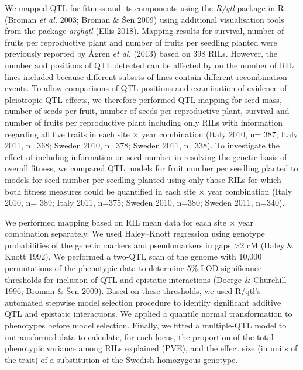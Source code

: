 \documentclass[12pt,]{article}
\begin{document}
We mapped QTL for fitness and its components using the \emph{R/qtl} package in R (Broman \emph{et al.} 2003; Broman \& Šen 2009) using additional visualisation tools from the package \emph{arghqtl} (Ellis 2018). Mapping results for survival, number of fruits per reproductive plant and number of fruits per seedling planted were previously reported by Ågren \emph{et al.} (2013) based on 398 RILs. However, the number and positions of QTL detected can be affected by on the number of RIL lines included because different subsets of lines contain different recombination events. To allow comparisons of QTL positions and examination of evidence of pleiotropic QTL effects, we therefore performed QTL mapping for seed mass, number of seeds per fruit, number of seeds per reproductive plant, survival and number of fruits per reproductive plant including only RILs with information regarding all five traits in each site × year combination (Italy 2010, n= 387; Italy 2011, n=368; Sweden 2010, n=378; Sweden 2011, n=338). To investigate the effect of including information on seed number in resolving the genetic basis of overall fitness, we compared QTL models for fruit number per seedling planted to models for seed number per seedling planted using only those RILs for which both fitness measures could be quantified in each site × year combination (Italy 2010, n= 389; Italy 2011, n=375; Sweden 2010, n=380; Sweden 2011, n=340).

We performed mapping based on RIL mean data for each site × year combination separately. We used Haley--Knott regression using genotype probabilities of the genetic markers and pseudomarkers in gaps \textgreater{}2 cM (Haley \& Knott 1992). We performed a two-QTL scan of the genome with 10,000 permutations of the phenotypic data to determine 5\% LOD-significance thresholds for inclusion of QTL and epistatic interactions (Doerge \& Churchill 1996; Broman \& Šen 2009). Based on these thresholds, we used R/qtl's automated stepwise model selection procedure to identify significant additive QTL and epistatic interactions. We applied a quantile normal transformation to phenotypes before model selection. Finally, we fitted a multiple-QTL model to untransformed data to calculate, for each locus, the proportion of the total phenotypic variance among RILs explained (PVE), and the effect size (in units of the trait) of a substitution of the Swedish homozygous genotype.
\end{document}

